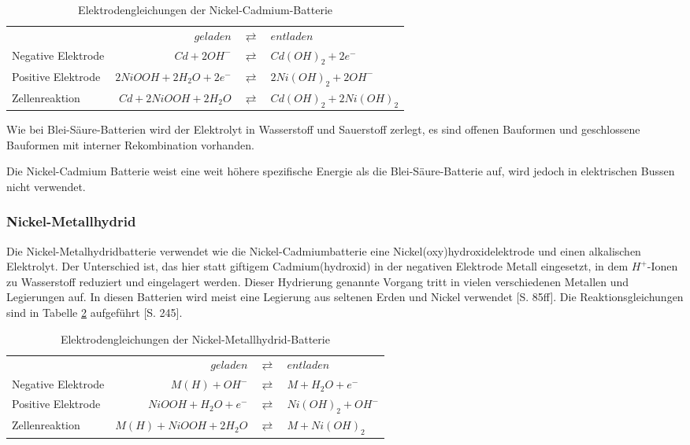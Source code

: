 \begin{table}\centering
  \begin{tabularx}{\linewidth}{XrcX}
  	                   &               $geladen$ & $\rightleftarrows$ & $entladen$             \\
  	Negative Elektrode &            $Cd + 2OH^-$ & $\rightleftarrows$ & $Cd(OH)_2 + 2e^-$      \\
  	Positive Elektrode & $2NiOOH + 2H_2O + 2e^-$ & $\rightleftarrows$ & $2Ni(OH)_2 + 2OH^-$    \\ \midrule
  	Zellenreaktion     &   $Cd + 2NiOOH + 2H_2O$ & $\rightleftarrows$ & $Cd(OH)_2 + 2Ni(OH)_2$ \\
  \end{tabularx}
  \caption{Elektrodengleichungen der Nickel-Cadmium-Batterie}
  \label{NiCd}
\end{table}

Wie bei Blei-Säure-Batterien wird der Elektrolyt in Wasserstoff und Sauerstoff zerlegt, es sind offenen Bauformen und geschlossene Bauformen mit interner Rekombination vorhanden.

Die Nickel-Cadmium Batterie weist eine weit höhere spezifische Energie als die Blei-Säure-Batterie auf, wird jedoch in elektrischen Bussen nicht verwendet.

\subsubsection{Nickel-Metallhydrid}
Die Nickel-Metalhydridbatterie verwendet wie die Nickel-Cadmiumbatterie eine Nickel(oxy)hydroxidelektrode und einen alkalischen Elektrolyt. Der Unterschied ist, das hier statt giftigem Cadmium(hydroxid) in der negativen Elektrode Metall eingesetzt, in dem $H^+$-Ionen zu Wasserstoff reduziert und eingelagert werden. Dieser Hydrierung genannte Vorgang tritt in vielen verschiedenen Metallen und Legierungen auf. In diesen Batterien wird meist eine Legierung aus seltenen Erden und Nickel verwendet \cite{KiehneBattery}[S. 85ff]. Die Reaktionsgleichungen sind in Tabelle \ref{NiMH} aufgeführt \cite{Sterner:2014}[S. 245].

\begin{table}\centering
  \begin{tabularx}{\linewidth}{XrcX}
  	                   &              $geladen$ & $\rightleftarrows$ & $entladen$        \\
  	Negative Elektrode &          $M(H) + OH^-$ & $\rightleftarrows$ & $M + H_2O + e^-$  \\
  	Positive Elektrode &   $NiOOH + H_2O + e^-$ & $\rightleftarrows$ & $Ni(OH)_2 + OH^-$ \\ \midrule
  	Zellenreaktion     & $M(H) + NiOOH + 2H_2O$ & $\rightleftarrows$ & $M + Ni(OH)_2$    \\
  \end{tabularx}
  \caption{Elektrodengleichungen der Nickel-Metallhydrid-Batterie}
  \label{NiMH}
\end{table}

